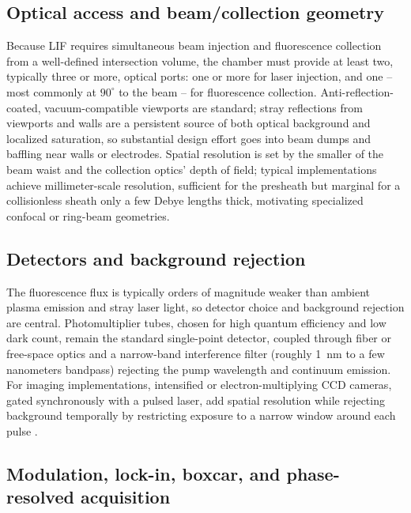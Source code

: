 \subsection{Optical access and beam/collection geometry}

Because LIF requires simultaneous beam injection and fluorescence collection from a well-defined intersection volume, the chamber must provide at least two, typically three or more, optical ports: one or more for laser injection, and one -- most commonly at $90^{\circ}$ to the beam -- for fluorescence collection. Anti-reflection-coated, vacuum-compatible viewports are standard; stray reflections from viewports and walls are a persistent source of both optical background and localized saturation, so substantial design effort goes into beam dumps and baffling near walls or electrodes. Spatial resolution is set by the smaller of the beam waist and the collection optics' depth of field; typical implementations achieve millimeter-scale resolution, sufficient for the presheath but marginal for a collisionless sheath only a few Debye lengths thick, motivating specialized confocal or ring-beam geometries.

\subsection{Detectors and background rejection}

The fluorescence flux is typically orders of magnitude weaker than ambient plasma emission and stray laser light, so detector choice and background rejection are central. Photomultiplier tubes, chosen for high quantum efficiency and low dark count, remain the standard single-point detector, coupled through fiber or free-space optics and a narrow-band interference filter (roughly \SI{1}{\nano\meter} to a few nanometers bandpass) rejecting the pump wavelength and continuum emission. For imaging implementations, intensified or electron-multiplying CCD cameras, gated synchronously with a pulsed laser, add spatial resolution while rejecting background temporally by restricting exposure to a narrow window around each pulse \cite{ref0304}.

\subsection{Modulation, lock-in, boxcar, and phase-resolved acquisition}

